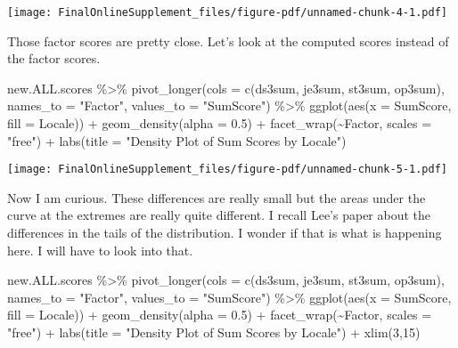 \documentclass[
  letterpaper,
  DIV=11,
  numbers=noendperiod]{scrartcl}
\newenvironment{Shaded}{\begin{snugshade}}{\end{snugshade}}
\newcommand{\AttributeTok}[1]{\textcolor[rgb]{0.40,0.45,0.13}{#1}}
\newcommand{\DecValTok}[1]{\textcolor[rgb]{0.68,0.00,0.00}{#1}}
\newcommand{\FloatTok}[1]{\textcolor[rgb]{0.68,0.00,0.00}{#1}}
\newcommand{\FunctionTok}[1]{\textcolor[rgb]{0.28,0.35,0.67}{#1}}
\newcommand{\NormalTok}[1]{\textcolor[rgb]{0.00,0.23,0.31}{#1}}
\newcommand{\SpecialCharTok}[1]{\textcolor[rgb]{0.37,0.37,0.37}{#1}}
\newcommand{\StringTok}[1]{\textcolor[rgb]{0.13,0.47,0.30}{#1}}
\begin{document}
\texttt{[image: FinalOnlineSupplement\_files/figure-pdf/unnamed-chunk-4-1.pdf]}

Those factor scores are pretty close. Let's look at the computed scores
instead of the factor scores.

\begin{Shaded}
\begin{Highlighting}[]
\NormalTok{new.ALL.scores }\SpecialCharTok{\%\textgreater{}\%}
  \FunctionTok{pivot\_longer}\NormalTok{(}\AttributeTok{cols =} \FunctionTok{c}\NormalTok{(ds3sum, je3sum, st3sum, op3sum), }
               \AttributeTok{names\_to =} \StringTok{"Factor"}\NormalTok{, }
               \AttributeTok{values\_to =} \StringTok{"SumScore"}\NormalTok{) }\SpecialCharTok{\%\textgreater{}\%}
  \FunctionTok{ggplot}\NormalTok{(}\FunctionTok{aes}\NormalTok{(}\AttributeTok{x =}\NormalTok{ SumScore, }
             \AttributeTok{fill =}\NormalTok{ Locale)) }\SpecialCharTok{+}
  \FunctionTok{geom\_density}\NormalTok{(}\AttributeTok{alpha =} \FloatTok{0.5}\NormalTok{) }\SpecialCharTok{+}
  \FunctionTok{facet\_wrap}\NormalTok{(}\SpecialCharTok{\textasciitilde{}}\NormalTok{Factor, }\AttributeTok{scales =} \StringTok{"free"}\NormalTok{) }\SpecialCharTok{+}
  \FunctionTok{labs}\NormalTok{(}\AttributeTok{title =} \StringTok{"Density Plot of Sum Scores by Locale"}\NormalTok{)}
\end{Highlighting}
\end{Shaded}

\texttt{[image: FinalOnlineSupplement\_files/figure-pdf/unnamed-chunk-5-1.pdf]}

Now I am curious. These differences are really small but the areas under
the curve at the extremes are really quite different. I recall Lee's
paper about the differences in the tails of the distribution. I wonder
if that is what is happening here. I will have to look into that.

\begin{Shaded}
\begin{Highlighting}[]
\NormalTok{new.ALL.scores }\SpecialCharTok{\%\textgreater{}\%}
  \FunctionTok{pivot\_longer}\NormalTok{(}\AttributeTok{cols =} \FunctionTok{c}\NormalTok{(ds3sum, je3sum, st3sum, op3sum), }
               \AttributeTok{names\_to =} \StringTok{"Factor"}\NormalTok{, }
               \AttributeTok{values\_to =} \StringTok{"SumScore"}\NormalTok{) }\SpecialCharTok{\%\textgreater{}\%}
  \FunctionTok{ggplot}\NormalTok{(}\FunctionTok{aes}\NormalTok{(}\AttributeTok{x =}\NormalTok{ SumScore, }
             \AttributeTok{fill =}\NormalTok{ Locale)) }\SpecialCharTok{+}
  \FunctionTok{geom\_density}\NormalTok{(}\AttributeTok{alpha =} \FloatTok{0.5}\NormalTok{) }\SpecialCharTok{+}
  \FunctionTok{facet\_wrap}\NormalTok{(}\SpecialCharTok{\textasciitilde{}}\NormalTok{Factor, }\AttributeTok{scales =} \StringTok{"free"}\NormalTok{) }\SpecialCharTok{+}
  \FunctionTok{labs}\NormalTok{(}\AttributeTok{title =} \StringTok{"Density Plot of Sum Scores by Locale"}\NormalTok{) }\SpecialCharTok{+}
  \FunctionTok{xlim}\NormalTok{(}\DecValTok{3}\NormalTok{,}\DecValTok{15}\NormalTok{)}
\end{Highlighting}
\end{Shaded}
\end{document}

